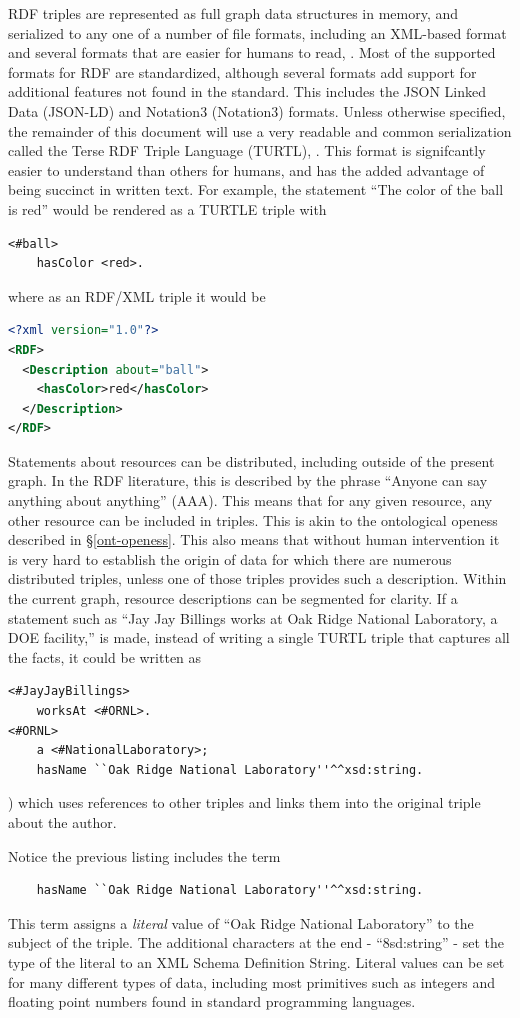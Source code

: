 RDF triples are represented as full graph data structures in memory, and
serialized to any one of a number of file formats, including an XML-based format
and several formats that are easier for humans to read, \cite{rdf-wikipedia}.
Most of the supported formats for RDF are standardized, although several formats
add support for additional features not found in the standard. This includes the
JSON Linked Data (JSON-LD) and Notation3 (Notation3) formats. Unless otherwise
specified, the remainder of this document will use a very readable and common
serialization called the Terse RDF Triple Language (TURTL), \cite{turtl}. This
format is signifcantly easier to understand than others for humans, and has the added
advantage of being succinct in written text. For example, the statement ``The
color of the ball is red'' would be rendered as a TURTLE triple with
\begin{lstlisting}
<#ball>
    hasColor <red>.
\end{lstlisting}
where as an RDF/XML triple it would be
\begin{lstlisting}[language=XML]
<?xml version="1.0"?>
<RDF>
  <Description about="ball">
    <hasColor>red</hasColor>
  </Description>
</RDF>
\end{lstlisting}

Statements about resources can be distributed, including outside of the
present graph. In the RDF literature, this is described by the
phrase ``Anyone can say anything about anything'' (AAA). This means that for any
given resource, any other resource can be included in triples. This is akin to
the ontological openess described in \S \ref{ont-openess}. This also means that
without human intervention it is very hard to establish the origin of data
for which there are numerous distributed triples, unless one of those
triples provides such a description. Within the current graph, resource
descriptions can be segmented for clarity. If a statement such as ``Jay Jay
Billings works at Oak Ridge National Laboratory, a DOE facility,'' is made,
instead of writing a single TURTL triple that captures all the facts, it
could be written as
\begin{lstlisting}
<#JayJayBillings>
    worksAt <#ORNL>.
<#ORNL>
    a <#NationalLaboratory>;
    hasName ``Oak Ridge National Laboratory''^^xsd:string.    
\end{lstlisting})
which uses references to other triples and links them into the original
triple about the author.

Notice the previous listing includes the term
\begin{lstlisting}
    hasName ``Oak Ridge National Laboratory''^^xsd:string.
\end{lstlisting}
This term assigns a \textit{literal} value of ``Oak Ridge National Laboratory''
to the subject of the triple. The additional characters at the end -
``^^xsd:string'' - set the type of the literal to an XML Schema Definition
String. Literal values can be set for many different types of data, including
most primitives such as integers and floating point numbers found in standard
programming languages.

